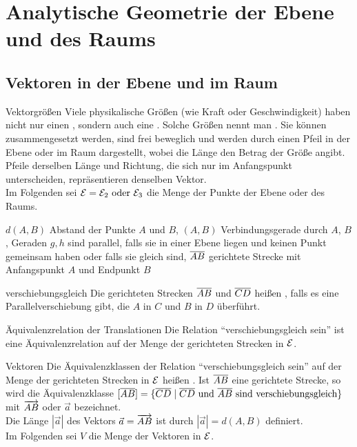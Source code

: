 \section{%
    Analytische Geometrie der Ebene und des Raums%
}

\subsection{%
    Vektoren in der Ebene und im Raum%
}

\begin{Def}{Vektorgrößen}
    Viele physikalische Größen (wie Kraft oder Geschwindigkeit) haben nicht nur
    einen , sondern auch eine .
    Solche Größen nennt man .
    Sie können zusammengesetzt werden, sind frei beweglich und werden durch
    einen Pfeil in der Ebene oder im Raum dargestellt, wobei die Länge
    den Betrag der Größe angibt.
    Pfeile derselben Länge und Richtung, die sich nur im Anfangspunkt
    unterscheiden, repräsentieren denselben Vektor. \\
    Im Folgenden sei $\mathcal{E} = \mathcal{E}_2 \text{ oder } \mathcal{E}_3$
    die Menge der Punkte der Ebene oder des Raums.
\end{Def}

\begin{Notation}
    $d(A, B)$ Abstand der Punkte $A$ und $B$, \qquad
    $(A, B)$ Verbindungsgerade durch $A$, $B$, \qquad
    Geraden $g, h$ sind parallel, falls sie in einer Ebene liegen und keinen
    Punkt gemeinsam haben oder falls sie gleich sind, \qquad
    $\overline{AB}$ gerichtete Strecke mit Anfangspunkt $A$ und Endpunkt $B$
\end{Notation}

\begin{Def}{verschiebungsgleich}
    Die gerichteten Strecken $\overline{AB}$ und $\overline{CD}$ heißen
    , falls es eine Parallelverschiebung gibt,
    die $A$ in $C$ und $B$ in $D$ überführt.
\end{Def}

\begin{Lemma}{Äquivalenzrelation der Translationen}
    Die Relation "`verschiebungsgleich sein"' ist eine Äquivalenzrelation
    auf der Menge der gerichteten Strecken in $\mathcal{E}$.
\end{Lemma}

\begin{Def}{Vektoren}
    Die Äquivalenzklassen der Relation "`verschiebungsgleich sein"'
    auf der Menge der gerichteten Strecken in $\mathcal{E}$ heißen
    .
    Ist $\overline{AB}$ eine gerichtete Strecke, so wird die Äquivalenzklasse
    $[\overline{AB}] = \{\overline{CD} \;|\; \overline{CD} \text{ und }
    \overline{ AB } \text{ sind verschiebungsgleich}\}$ mit $\overrightarrow{AB}$
    oder $\vec{a}$ bezeichnet. \\
    Die Länge $|\vec{a}|$ des Vektors $\vec{a} = \overrightarrow{AB}$ ist durch
    $|\vec{a}| = d(A, B)$ definiert. \\
    Im Folgenden sei $V$ die Menge der Vektoren in $\mathcal{E}$.
\end{Def}

